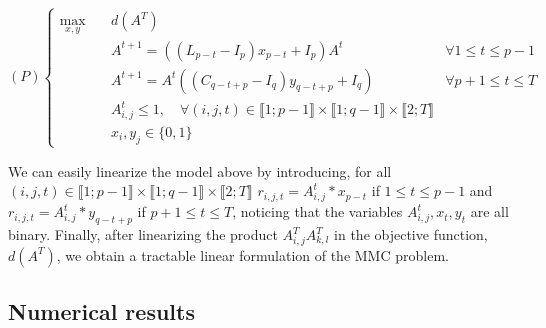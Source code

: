 \begin{equation*}
(P)\left\{
\begin{array}{lll}
\max\limits_{x,y}  \quad	& d(A^T)  \\
& A^{t+1}= ((L_{p-t}-I_p)x_{p-t}+I_p)A^t \qquad & \forall 1\le t\le p-1\\
& A^{t+1}= A^t((C_{q-t+p}-I_q)y_{q-t+p}+I_q) \qquad & \forall p+1\le t\le T\\
& A^t_{i,j} \le 1, \quad \forall (i,j,t) \in \llbracket 1; p-1 \rrbracket \times \llbracket 1; q-1 \rrbracket \times \llbracket 2; T \rrbracket \\
& x_i,y_j \in \{0,1\}
\end{array}\right.
\end{equation*}

\noindent We can easily linearize the model above by introducing, for all $(i,j,t) \in \llbracket 1; p-1 \rrbracket \times \llbracket 1; q-1 \rrbracket \times \llbracket 2; T \rrbracket $ $r_{i,j,t}=A^t_{i,j}*x_{p-t}$ if $1\le t\le p-1$ and $r_{i,j,t}=A^t_{i,j}*y_{q-t+p}$ if $p+1\le t\le T$, noticing that the variables $A^t_{i,j},x_t,y_t$ are all binary. Finally, after linearizing the product $A^T_{i,j}A^T_{k,l}$ in the objective function, $d(A^T)$, we obtain a tractable linear formulation of the MMC problem.



\subsection{Numerical results}


